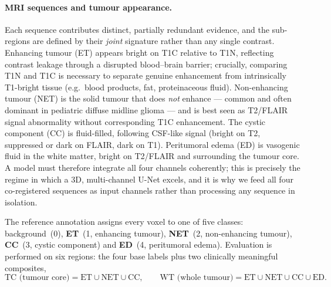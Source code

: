 \documentclass[11pt,a4paper]{article}
\begin{document}
\paragraph{MRI sequences and tumour appearance.}
Each sequence contributes distinct, partially redundant evidence, and the
sub-regions are defined by their \emph{joint} signature rather than any single
contrast. Enhancing tumour (ET) appears bright on T1C relative to T1N, reflecting
contrast leakage through a disrupted blood--brain barrier; crucially, comparing T1N
and T1C is necessary to separate genuine enhancement from intrinsically T1-bright
tissue (e.g.\ blood products, fat, proteinaceous fluid). Non-enhancing tumour (NET)
is the solid tumour that does \emph{not} enhance --- common and often dominant in
pediatric diffuse midline glioma --- and is best seen as T2/FLAIR signal abnormality
without corresponding T1C enhancement. The cystic component (CC) is fluid-filled,
following CSF-like signal (bright on T2, suppressed or dark on FLAIR, dark on T1).
Peritumoral edema (ED) is vasogenic fluid in the white matter, bright on T2/FLAIR and
surrounding the tumour core. A model must therefore integrate all four channels
coherently; this is precisely the regime in which a 3D, multi-channel U-Net excels,
and it is why we feed all four co-registered sequences as input channels rather than
processing any sequence in isolation.

The reference annotation assigns every voxel to one of five classes:
background~(0), \textbf{ET}~(1, enhancing tumour), \textbf{NET}~(2, non-enhancing
tumour), \textbf{CC}~(3, cystic component) and \textbf{ED}~(4, peritumoral edema).
Evaluation is performed on six regions: the four base labels plus two clinically
meaningful composites,
\[
\text{TC (tumour core)}=\text{ET}\cup\text{NET}\cup\text{CC},
\qquad
\text{WT (whole tumour)}=\text{ET}\cup\text{NET}\cup\text{CC}\cup\text{ED}.
\]
\end{document}

